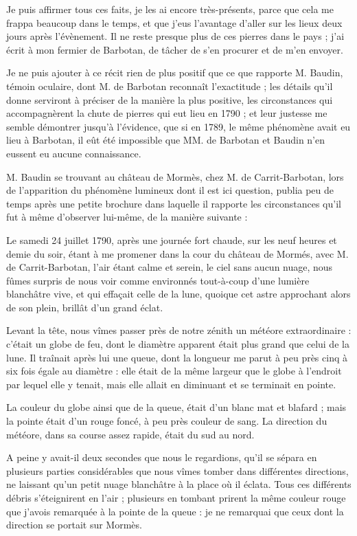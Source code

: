 \documentclass[a4paper, 12pt, oneside, french]{article}
\begin{document}
\og Je puis affirmer tous ces faits, je les ai encore très-présents, parce que cela me frappa beaucoup dans le temps, et que j'eus l'avantage d'aller sur les lieux deux jours après l'évènement. Il ne reste presque plus de ces pierres dans le pays ; j'ai écrit à mon fermier de Barbotan, de tâcher de s'en procurer et de m'en envoyer. \fg

Je ne puis ajouter à ce récit rien de plus positif que ce que rapporte M. Baudin, témoin oculaire, dont M. de Barbotan reconnaît l'exactitude ; les détails qu'il donne serviront à préciser de la manière la plus positive, les circonstances qui accompagnèrent la chute de pierres qui eut lieu en 1790 ; et leur justesse me semble démontrer jusqu'à l'évidence, que si en 1789, le même phénomène avait eu lieu à Barbotan, il eût été impossible que MM. de Barbotan et Baudin n'en eussent eu aucune connaissance.

M. Baudin se trouvant au château de Mormès, chez M. de Carrit-Barbotan, lors de l'apparition du phénomène lumineux dont il est ici question, publia peu de temps après une petite brochure dans laquelle il rapporte les circonstances qu'il fut à même d'observer lui-même, de la manière suivante :

\og Le samedi 24 juillet 1790, après une journée fort chaude, sur les neuf heures et demie du soir, étant à me promener dans la cour du château de Mormés, avec M. de Carrit-Barbotan, l'air étant calme et serein, le ciel sans aucun nuage, nous fûmes surpris de nous voir comme environnés tout-à-coup d'une lumière blanchâtre vive, et qui effaçait celle de la lune, quoique cet astre approchant alors de son plein, brillât d'un grand éclat. \fg

\og Levant la tête, nous vîmes passer près de notre zénith un météore extraordinaire : c'était un globe de feu, dont le diamètre apparent était plus grand que celui de la lune. Il traînait après lui une queue, dont la longueur me parut à peu près cinq à six fois égale au diamètre : elle était de la même largeur que le globe à l'endroit par lequel elle y tenait, mais elle allait en diminuant et se terminait en pointe. \fg

\og La couleur du globe ainsi que de la queue, était d'un blanc mat et blafard ; mais la pointe était d'un rouge foncé, à peu près couleur de sang. La direction du météore, dans sa course assez rapide, était du sud au nord. \fg

\og A peine y avait-il deux secondes que nous le regardions, qu'il se sépara en plusieurs parties considérables que nous vîmes tomber dans différentes directions, ne laissant qu'un petit nuage blanchâtre à la place où il éclata. Tous ces différents débris s'éteignirent en l'air ; plusieurs en tombant prirent la même couleur rouge que j'avois remarquée à la pointe de la queue : je ne remarquai que ceux dont la direction se portait sur Mormès. \fg
\end{document}
